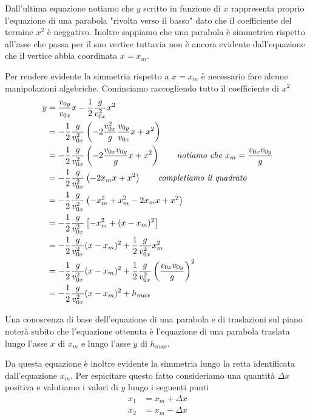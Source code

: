 \documentclass{article}
\begin{document}
Dall'ultima equazione notiamo che $y$ scritto in funzione di $x$ rappresenta proprio l'equazione di una parabola "rivolta verso il basso" dato che il coefficiente del termine $x^2$ è neggativo.
Inoltre sappiamo che una parabola è simmetrica rispetto all'asse che passa per il suo vertice tuttavia non è ancora evidente dall'equazione che il vertice abbia coordinata $x=x_m$.

Per rendere evidente la simmetria rispetto a $x=x_m$ è necessario fare alcune manipolazioni algebriche. Cominciamo raccogliendo tutto il coefficiente di $x^2$
\begin{align}
  y &= \frac{v_{0y}}{v_{0x}} x - \frac{1}{2}\frac{g}{v_{0x}^2}x^2 \\
    &= -\frac{1}{2}\frac{g}{v_{0x}^2} \left(-2\frac{v_{0x}^2}{g}\frac{v_{0y}}{v_{0x}}x + x^2\right) \\
    &= -\frac{1}{2}\frac{g}{v_{0x}^2} \left(-2\frac{v_{0x}v_{0y}}{g}x + x^2\right) \qquad\text{\textit{notiamo che $x_m=\frac{v_{0x}v_{0y}}{g}$}} \\
    &= -\frac{1}{2}\frac{g}{v_{0x}^2} \left(-2x_mx + x^2\right) \qquad \text{\textit{completiamo il quadrato}} \\
    &= -\frac{1}{2}\frac{g}{v_{0x}^2} \left(-x_m^2 + x_m^2 -2x_mx + x^2\right) \\
    &= -\frac{1}{2}\frac{g}{v_{0x}^2} \left[-x_m^2 + (x-x_m)^2\right] \\
    &= -\frac{1}{2}\frac{g}{v_{0x}^2} (x-x_m)^2 + \frac{1}{2}\frac{g}{v_{0x}^2}x_m^2 \\
    &= -\frac{1}{2}\frac{g}{v_{0x}^2} (x-x_m)^2 + \frac{1}{2}\frac{g}{v_{0x}^2}\left(\frac{v_{0x}v_{0y}}{g}\right)^2 \\
    &= -\frac{1}{2}\frac{g}{v_{0x}^2} (x-x_m)^2 + h_{max}
\end{align}

Una conoscenza di base dell'equazione di una parabola e di traslazioni sul piano noterà subito che l'equazione ottenuta è l'equazione di una parabola traslata lungo l'asse $x$ di $x_m$ e lungo l'asse $y$ di $h_{max}$.

Da questa equazione è inoltre evidente la simmetria lungo la retta identificata dall'equazione $x_m$. Per espicitare questo fatto consideriamo una quantità $\Delta x$ positiva e valutiamo i valori di $y$ lungo i seguenti punti
\begin{align}
  x_1 &= x_m + \Delta x \\
  x_2 &= x_m - \Delta x
\end{align}
\end{document}
